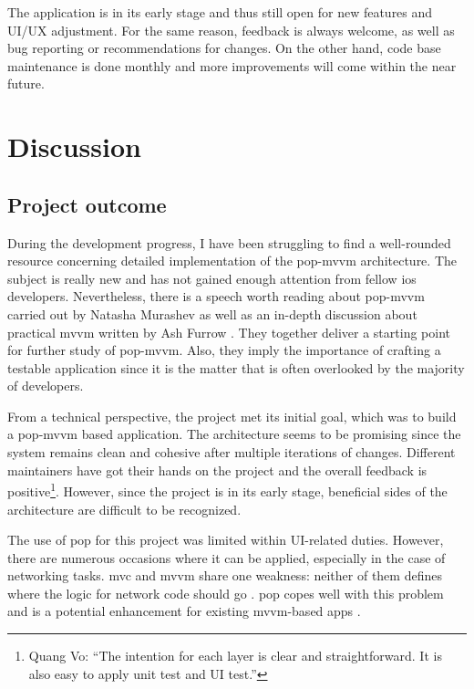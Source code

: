 \documentclass[11pt,a4paper,oneside,article]{memoir}
\begin{document}
The application is in its early stage and thus still open for new features and UI/UX adjustment. For the same reason, feedback is always welcome, as well as bug reporting or recommendations for changes. On the other hand, code base maintenance is done monthly and more improvements will come within the near future.

\newpage
\chapter{Discussion}

\section{Project outcome}\label{discussion:outcome}
During the development progress, I have been struggling to find a well-rounded resource concerning detailed implementation of the \gls{pop-mvvm} architecture. The subject is really new and has not gained enough attention from fellow \gls{ios} developers. Nevertheless, there is a speech worth reading about \gls{pop-mvvm} carried out by Natasha Murashev as well as an in-depth discussion about practical \gls{mvvm} written by Ash Furrow \cite{natasha:popmvvm, ash:mvvm}. They together deliver a starting point for further study of \gls{pop-mvvm}. Also, they imply the importance of crafting a testable application since it is the matter that is often overlooked by the majority of developers. 

From a technical perspective, the project met its initial goal, which was to build a \gls{pop-mvvm} based application. The architecture seems to be promising since the system remains clean and cohesive after multiple iterations of changes. Different maintainers have got their hands on the project and the overall feedback is positive\footnote{Quang Vo: ``The intention for each layer is clear and straightforward. It is also easy to apply unit test and UI test.''}. However, since the project is in its early stage, beneficial sides of the architecture are difficult to be recognized. 

The use of \gls{pop} for this project was limited within UI-related duties. However, there are numerous occasions where it can be applied, especially in the case of networking tasks. \gls{mvc} and \gls{mvvm} share one weakness: neither of them defines where the logic for network code should go \cite{ash:mvvm}. \gls{pop} copes well with this problem and is a potential enhancement for existing \gls{mvvm}-based apps \cite{marisi:pop}. 
\end{document}
